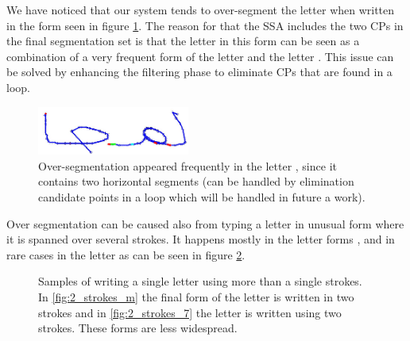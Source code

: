\documentclass[journal,compsoc]{IEEEtran}
\begin{document}
We have noticed that our system tends to over-segment the letter  when written in the form seen in figure \ref{fig:oversegmentation_m}. The reason for that the SSA includes the two CPs in the final segmentation set is that the letter in this form can be seen as a combination of a very frequent form of the letter  and the letter . This issue can be solved by enhancing the filtering phase to eliminate CPs that are found in a loop.  

\begin{figure}
\centering
\includegraphics[width=5cm]{./figures/oversegmentation_m}
\caption{Over-segmentation appeared frequently in the letter , since it contains two horizontal segments (can be handled by elimination candidate points in a loop which will be handled in future a work).}
\label{fig:oversegmentation_m}
\end{figure}

Over segmentation can be caused also from typing a letter in unusual form where it is spanned over several strokes. It happens mostly in the letter forms ,  and in rare cases in the letter  as can be seen in figure \ref{fig:multiple_strokes_letter}.

\begin{figure}[h]
\centering
    \caption{Samples of writing a single letter using more than a single strokes. In \ref{fig:2_strokes_m} the final form of the letter  is written in two strokes and in \ref{fig:2_strokes_7} the letter  is written using two strokes. These forms are less widespread.}
   \label{fig:multiple_strokes_letter}
\end{figure}
\end{document}
